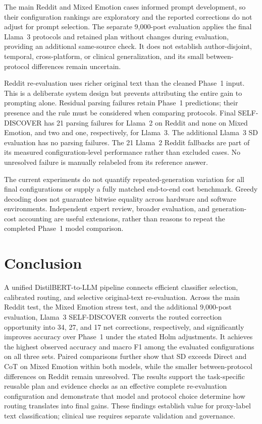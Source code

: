 \documentclass{ieeeaccess}
\begin{document}
The main Reddit and Mixed Emotion cases informed prompt development, so their configuration rankings are exploratory and the reported corrections do not adjust for prompt selection. The separate 9,000-post evaluation applies the final Llama~3 protocols and retained plan without changes during evaluation, providing an additional same-source check. It does not establish author-disjoint, temporal, cross-platform, or clinical generalization, and its small between-protocol differences remain uncertain.

Reddit re-evaluation uses richer original text than the cleaned Phase~1 input. This is a deliberate system design but prevents attributing the entire gain to prompting alone. Residual parsing failures retain Phase~1 predictions; their presence and the rule must be considered when comparing protocols. Final SELF-DISCOVER has 21 parsing failures for Llama~2 on Reddit and none on Mixed Emotion, and two and one, respectively, for Llama~3. The additional Llama~3 SD evaluation has no parsing failures. The 21 Llama~2 Reddit fallbacks are part of its measured configuration-level performance rather than excluded cases. No unresolved failure is manually relabeled from its reference answer.

The current experiments do not quantify repeated-generation variation for all final configurations or supply a fully matched end-to-end cost benchmark. Greedy decoding does not guarantee bitwise equality across hardware and software environments. Independent expert review, broader evaluation, and generation-cost accounting are useful extensions, rather than reasons to repeat the completed Phase~1 model comparison.

\section{Conclusion}
A unified DistilBERT-to-LLM pipeline connects efficient classifier selection, calibrated routing, and selective original-text re-evaluation. Across the main Reddit test, the Mixed Emotion stress test, and the additional 9,000-post evaluation, Llama~3 SELF-DISCOVER converts the routed correction opportunity into 34, 27, and 17 net corrections, respectively, and significantly improves accuracy over Phase~1 under the stated Holm adjustments. It achieves the highest observed accuracy and macro F1 among the evaluated configurations on all three sets. Paired comparisons further show that SD exceeds Direct and CoT on Mixed Emotion within both models, while the smaller between-protocol differences on Reddit remain unresolved. The results support the task-specific reusable plan and evidence checks as an effective complete re-evaluation configuration and demonstrate that model and protocol choice determine how routing translates into final gains. These findings establish value for proxy-label text classification; clinical use requires separate validation and governance.
\end{document}
